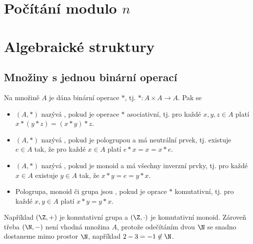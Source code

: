 \section{Počítání modulo \texorpdfstring{$n$}{n}}
\section*{Algebraické struktury}
\subsection{Množiny s jednou binární operací}\label{grupa}
Na množině $A$ je dána binární operace $*$, tj. $* : A \times A \rightarrow A$. Pak se
\begin{itemize}
	\item $(A, *)$ nazývá , pokud je operace $*$ asociativní, tj. pro každé $x, y, z \in A$ platí \\ $x * (y * z) = (x * y) * z$.
	\item $(A, *)$ nazývá , pokud je pologrupou a má neutrální prvek, tj. existuje $e \in A$ tak, že pro každé $x \in A$ platí $e * x = x = x * e$.
	\item $(A, *)$ nazývá , pokud je monoid a má všechny inverzní prvky, tj. pro každé $x \in A$ existuje $y \in A$ tak, že $x * y = e = y * x$.
	\item Pologrupa, monoid či grupa jsou , pokud je oprace $*$ komutativní, tj. pro každé $x, y \in A$ platí $x * y = y * x$.
\end{itemize} 
Například $(\Z, +)$ je komutativní grupa a $(\Z, \cdot)$ je komutativní monoid. Zároveň třeba $(\N, -)$ není vhodná množina $A$, protože odečítáním dvou $\N$ se snadno dostaneme mimo prostor $\N$, například $2 - 3 = -1 \not\in \N$.

